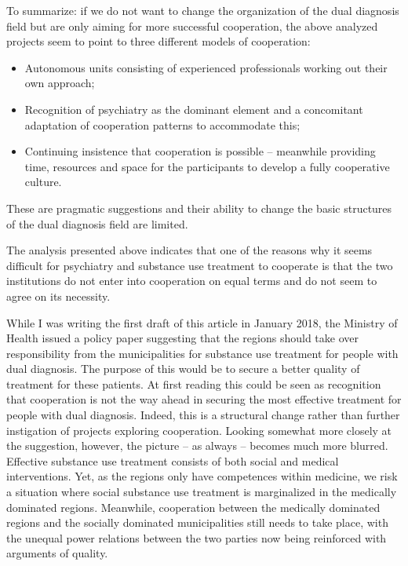 \begin{multicols}{2}
\par
To summarize: if we do not want to change the organization of the dual diagnosis field but are only aiming for more successful cooperation, the above analyzed projects seem to point to three different models of cooperation:
    \begin{itemize}
        \item Autonomous units consisting of experienced professionals working out their own approach;
        \item Recognition of psychiatry as the dominant element and a concomitant adaptation of cooperation patterns to accommodate this;
        \item Continuing insistence that cooperation is possible – meanwhile providing time, resources and space for the participants to develop a fully cooperative culture.
    \end{itemize}
These are pragmatic suggestions and their ability to change the basic structures of the dual diagnosis field are limited. 
\par
The analysis presented above indicates that one of the reasons why it seems difficult for psychiatry and substance use treatment to cooperate is that the two institutions do not enter into cooperation on equal terms and do not seem to agree on its necessity.
\par
While I was writing the first draft of this article in January 2018, the Ministry of Health issued a policy paper suggesting that the regions should take over responsibility from the municipalities for substance use treatment for people with dual diagnosis. The purpose of this would be to secure a better quality of treatment for these patients. At first reading this could be seen as recognition that cooperation is not the way ahead in securing the most effective treatment for people with dual diagnosis. Indeed, this is a structural change rather than further instigation of projects exploring cooperation. Looking somewhat more closely at the suggestion, however, the picture – as always – becomes much more blurred. Effective substance use treatment consists of both social and medical interventions. Yet, as the regions only have competences within medicine, we risk a situation where social substance use treatment is marginalized in the medically dominated regions. Meanwhile, cooperation between the medically dominated regions and the socially dominated municipalities still needs to take place, with the unequal power relations between the two parties now being reinforced with arguments of quality.


\end{multicols}
